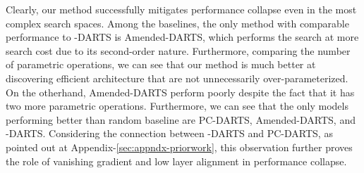 \documentclass{article} \usepackage{fancyhdr, iclr2023_conference, times}
\newcommand{\mydarts}{-DARTS\xspace}
\newcommand{\lambdafn}{layer alignment\xspace}
\begin{document}
\par Clearly, our method successfully mitigates performance collapse even in the most complex search spaces. Among the baselines, the only method with comparable performance to \mydarts is Amended-DARTS, which performs the search at  more search cost due to its second-order nature. Furthermore, comparing the number of parametric operations, we can see that our method is much better at discovering efficient architecture that are not unnecessarily over-parameterized. On the otherhand, Amended-DARTS perform poorly despite the fact that it has two more parametric operations. Furthermore, we can see that the only models performing better than random baseline are PC-DARTS, Amended-DARTS, and \mydarts. Considering the connection between \mydarts and PC-DARTS, as pointed out at Appendix-\ref{sec:appndx-priorwork}, this observation further proves the role of vanishing gradient and low \lambdafn in performance collapse.
\end{document}
